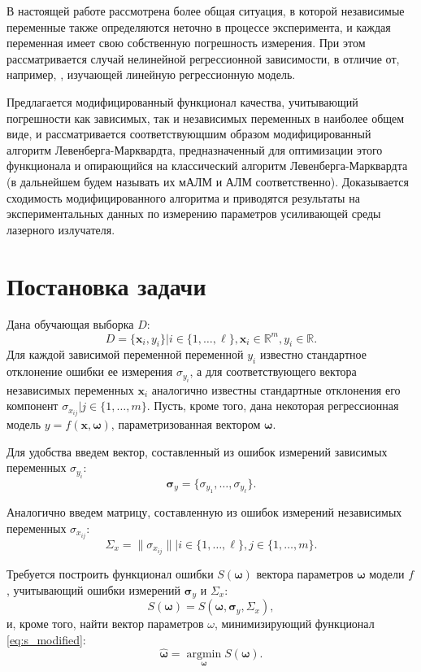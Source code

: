 \documentclass[11pt,a4paper]{article}
\newcommand{\bomega}{\boldsymbol{\omega}}
\begin{document}
В настоящей работе рассмотрена более общая ситуация, в которой независимые
переменные также определяются неточно в процессе эксперимента, и каждая переменная
имеет свою собственную погрешность измерения. При этом рассматривается случай
нелинейной регрессионной зависимости, в отличие от, например,
\cite{kiryati2000heteroscedastic}, изучающей линейную регрессионную модель.

Предлагается модифицированный
функционал качества, учитывающий погрешности как зависимых, так и независимых
переменных в наиболее общем виде, и рассматривается соответствующшим образом
модифицированный алгоритм Левенберга-Марквардта, предназначенный для оптимизации
этого функционала и опирающийся на классический алгоритм Левенберга-Марквардта
(в дальнейшем будем называть их мАЛМ и АЛМ соответственно).
Доказывается сходимость модифицированного алгоритма и приводятся
результаты на экспериментальных данных по измерению параметров усиливающей
среды лазерного излучателя.

\section{Постановка задачи}

Дана обучающая выборка $D$:
\begin{equation}
  D = \{ \mathbf{x}_i, y_i \} | i \in \{ 1, \dots, \ell \}, \mathbf{x}_i \in \mathbb{R}^m, y_i \in \mathbb{R}.
  \label{eq:d}
\end{equation}
Для каждой зависимой переменной переменной $y_i$ известно
стандартное отклонение ошибки ее измерения $\sigma_{y_i}$, а для соответствующего
вектора независимых переменных $\mathbf{x}_i$ аналогично известны стандартные
отклонения его компонент $\sigma_{x_{ij}} | j \in \{ 1, \dots, m \}$.
Пусть, кроме того, дана некоторая регрессионная модель
$y = f (\mathbf{x}, \bomega)$, параметризованная вектором $\bomega$.

Для удобства введем вектор, составленный из ошибок измерений зависимых переменных
$\sigma_{y_i}$:
\[
  \boldsymbol{\sigma}_y = \{ \sigma_{y_1}, \dots, \sigma_{y_{\ell}} \}.
\]

Аналогично введем матрицу, составленную из ошибок измерений независимых переменных
$\sigma_{x_{ij}}$:
\[
  \Sigma_x = \| \sigma_{x_{ij}} \| | i \in \{ 1, \dots, \ell \}, j \in \{ 1, \dots, m \}.
\]

Требуется построить функционал ошибки $S(\bomega)$ вектора параметров
$\bomega$ модели $f$, учитывающий ошибки измерений $\boldsymbol{\sigma}_y$ и
$\Sigma_x$:
\begin{equation}
  S(\bomega) = S(\bomega, \boldsymbol{\sigma}_y, \Sigma_x),
  \label{eq:s_modified}
\end{equation}
и, кроме того, найти вектор параметров $\omega$, минимизирующий функционал
\eqref{eq:s_modified}:
\begin{equation}
  \hat{\bomega} = \mathop{\arg \min}\limits_{\bomega} S(\bomega).
\end{equation}
\end{document}
